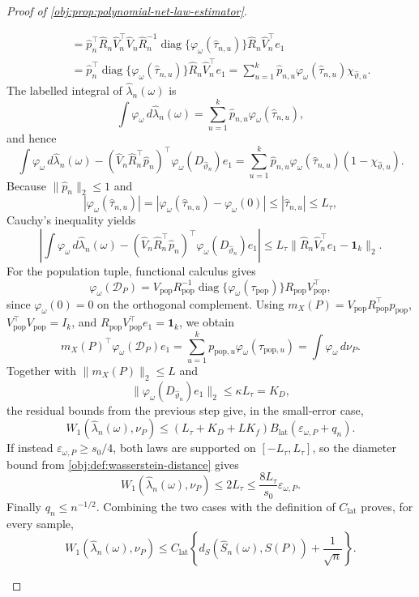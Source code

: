 \begin{proof}[Proof of \cref{obj:prop:polynomial-net-law-estimator}]
\begin{enumerate}
\[\begin{aligned}
&\quad=
\widehat p_n^\top\widehat R_n\widehat V_n^\top
\widehat V_n\widehat R_n^{-1}
\operatorname{diag}\{\varphi_\omega(\widehat\tau_{n,u})\}
\widehat R_n\widehat V_n^\top e_1 \\
&\quad=
\widehat p_n^\top
\operatorname{diag}\{\varphi_\omega(\widehat\tau_{n,u})\}
\widehat R_n\widehat V_n^\top e_1
=
\sum_{u=1}^k\widehat p_{n,u}\varphi_\omega(\widehat\tau_{n,u})\chi_{\widehat\vartheta,u}.
\end{aligned}
\]
The labelled integral of \(\widehat\lambda_n(\omega)\) is
\[
\int\varphi_\omega\,d\widehat\lambda_n(\omega)
=
\sum_{u=1}^k\widehat p_{n,u}\varphi_\omega(\widehat\tau_{n,u}),
\]
and hence
\[
\int\varphi_\omega\,d\widehat\lambda_n(\omega)
-
(\widehat V_n\widehat R_n^\top\widehat p_n)^\top
\varphi_\omega(D_{\widehat\vartheta_n})e_1
=
\sum_{u=1}^k
\widehat p_{n,u}\varphi_\omega(\widehat\tau_{n,u})(1-\chi_{\widehat\vartheta,u}).
\]
Because \(\|\widehat p_n\|_2\le1\) and
\[
|\varphi_\omega(\widehat\tau_{n,u})|
=
|\varphi_\omega(\widehat\tau_{n,u})-\varphi_\omega(0)|
\le|\widehat\tau_{n,u}|
\le L_\tau,
\]
Cauchy's inequality yields
\[
\left|
\int\varphi_\omega\,d\widehat\lambda_n(\omega)
-
(\widehat V_n\widehat R_n^\top\widehat p_n)^\top
\varphi_\omega(D_{\widehat\vartheta_n})e_1
\right|
\le
L_\tau\|\widehat R_n\widehat V_n^\top e_1-\mathbf1_k\|_2 .
\]
For the population tuple, functional calculus gives
\[
\varphi_\omega(\mathcal D_P)
=
V_{\mathrm{pop}}R_{\mathrm{pop}}^{-1}
\operatorname{diag}\{\varphi_\omega(\tau_{\mathrm{pop}})\}
R_{\mathrm{pop}}V_{\mathrm{pop}}^\top ,
\]
since \(\varphi_\omega(0)=0\) on the orthogonal complement.  Using
\(m_X(P)=V_{\mathrm{pop}}R_{\mathrm{pop}}^\top p_{\mathrm{pop}}\),
\(V_{\mathrm{pop}}^\top V_{\mathrm{pop}}=I_k\), and
\(R_{\mathrm{pop}}V_{\mathrm{pop}}^\top e_1=\mathbf1_k\), we obtain
\[
m_X(P)^\top\varphi_\omega(\mathcal D_P)e_1
=
\sum_{u=1}^k p_{\mathrm{pop},u}\varphi_\omega(\tau_{\mathrm{pop},u})
=
\int\varphi_\omega\,d\nu_P .
\]
Together with \(\|m_X(P)\|_2\le L\) and
\[
\|\varphi_\omega(D_{\widehat\vartheta_n})e_1\|_2
\le
\kappa L_\tau
=
K_D,
\]
the residual bounds from the previous step give, in the small-error case,
\[
W_1(\widehat\lambda_n(\omega),\nu_P)
\le
(L_\tau+K_D+LK_f)B_{\mathrm{lat}}(\varepsilon_{\omega,P}+q_n).
\]
If instead \(\varepsilon_{\omega,P}\ge s_0/4\), both laws are supported on
\([-L_\tau,L_\tau]\), so the diameter bound from \cref{obj:def:wasserstein-distance} gives
\[
W_1(\widehat\lambda_n(\omega),\nu_P)
\le2L_\tau
\le\frac{8L_\tau}{s_0}\varepsilon_{\omega,P}.
\]
Finally \(q_n\le n^{-1/2}\).  Combining the two cases with the definition of \(C_{\mathrm{lat}}\) proves, for every sample,
\[
W_1(\widehat\lambda_n(\omega),\nu_P)
\le
C_{\mathrm{lat}}
\left\{
d_S(\widehat S_n(\omega),S(P))+\frac1{\sqrt n}
\right\}.
\] %


\end{enumerate}
\end{proof}
